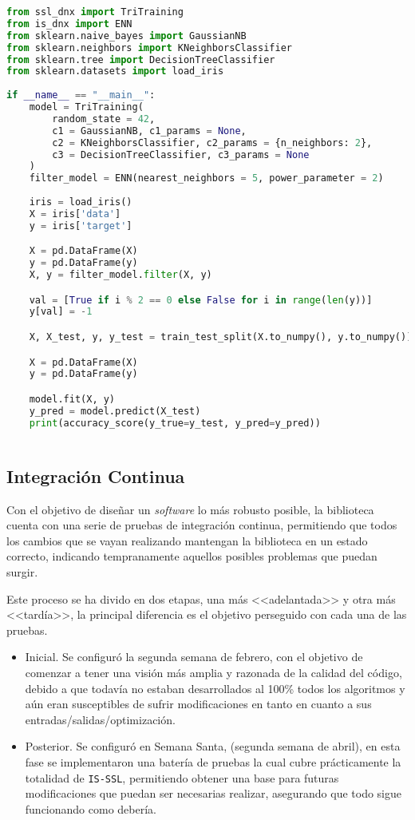 \begin{lstlisting}[language=Python, caption={Ejemplo de uso de IS-SSL}, label={lst:ejemplo}]
from ssl_dnx import TriTraining
from is_dnx import ENN
from sklearn.naive_bayes import GaussianNB
from sklearn.neighbors import KNeighborsClassifier
from sklearn.tree import DecisionTreeClassifier
from sklearn.datasets import load_iris
	
if __name__ == "__main__":
	model = TriTraining(
		random_state = 42,
		c1 = GaussianNB, c1_params = None,
		c2 = KNeighborsClassifier, c2_params = {n_neighbors: 2},
		c3 = DecisionTreeClassifier, c3_params = None	
	)
	filter_model = ENN(nearest_neighbors = 5, power_parameter = 2)
	
	iris = load_iris()
	X = iris['data']
	y = iris['target']

	X = pd.DataFrame(X)
	y = pd.DataFrame(y)
	X, y = filter_model.filter(X, y)

	val = [True if i % 2 == 0 else False for i in range(len(y))]
	y[val] = -1

	X, X_test, y, y_test = train_test_split(X.to_numpy(), y.to_numpy())

	X = pd.DataFrame(X)
	y = pd.DataFrame(y)

	model.fit(X, y)
	y_pred = model.predict(X_test)
	print(accuracy_score(y_true=y_test, y_pred=y_pred))
	
\end{lstlisting}
\pagebreak

\subsection{Integración Continua}
Con el objetivo de diseñar un \textit{software} lo más robusto posible, la biblioteca cuenta con una serie de pruebas de integración continua, permitiendo que todos los cambios que se vayan realizando mantengan la biblioteca en un estado correcto, indicando tempranamente aquellos posibles problemas que puedan surgir.

Este proceso se ha divido en dos etapas, una más <<adelantada>> y otra más <<tardía>>, la principal diferencia es el objetivo perseguido con cada una de las pruebas. 
\begin{itemize}
\item Inicial. Se configuró la segunda semana de febrero, con el objetivo de comenzar a tener una visión más amplia y razonada de la calidad del código, debido a que todavía no estaban desarrollados al 100\% todos los algoritmos y aún eran susceptibles de sufrir modificaciones en tanto en cuanto a sus entradas/salidas/optimización. 
\item Posterior. Se configuró en Semana Santa, (segunda semana de abril), en esta fase se implementaron una batería de pruebas la cual cubre prácticamente la totalidad de \texttt{IS-SSL}, permitiendo obtener una base para futuras modificaciones que puedan ser necesarias realizar, asegurando que todo sigue funcionando como debería.
\end{itemize}

